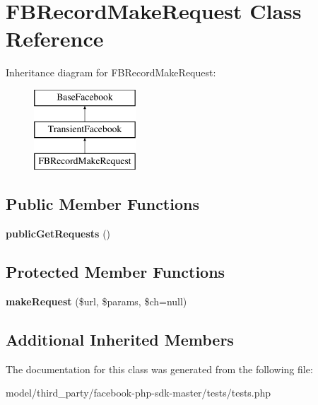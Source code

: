 \hypertarget{classFBRecordMakeRequest}{\section{F\-B\-Record\-Make\-Request Class Reference}
\label{classFBRecordMakeRequest}
}
Inheritance diagram for F\-B\-Record\-Make\-Request\-:\begin{figure}[H]
\begin{center}
\leavevmode
\includegraphics[height=3.000000cm]{classFBRecordMakeRequest}
\end{center}
\end{figure}
\subsection*{Public Member Functions}
\begin{DoxyCompactItemize}
\item 
\hypertarget{classFBRecordMakeRequest_a6852682a06ca7d54963770bcc9f6e41e}{{\bfseries public\-Get\-Requests} ()}\label{classFBRecordMakeRequest_a6852682a06ca7d54963770bcc9f6e41e}

\end{DoxyCompactItemize}
\subsection*{Protected Member Functions}
\begin{DoxyCompactItemize}
\item 
\hypertarget{classFBRecordMakeRequest_a03317f123383834e8c257cbdad64e556}{{\bfseries make\-Request} (\$url, \$params, \$ch=null)}\label{classFBRecordMakeRequest_a03317f123383834e8c257cbdad64e556}

\end{DoxyCompactItemize}
\subsection*{Additional Inherited Members}


The documentation for this class was generated from the following file\-:\begin{DoxyCompactItemize}
\item 
model/third\-\_\-party/facebook-\/php-\/sdk-\/master/tests/tests.\-php\end{DoxyCompactItemize}
